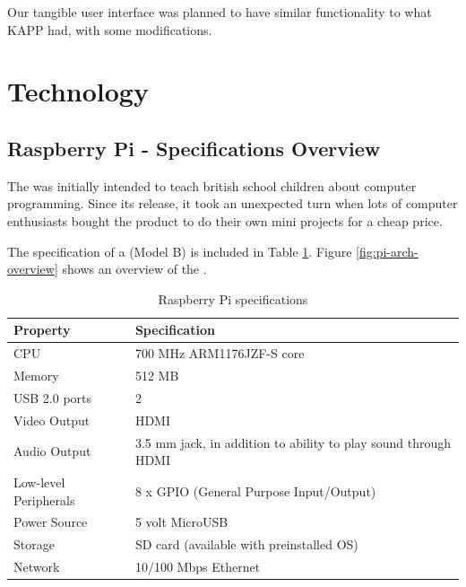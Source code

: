 Our tangible user interface was planned to have similar functionality to what KAPP had, with some modifications. 
 
\section{Technology}
\label{sec:technology}

\subsection{Raspberry Pi - Specifications Overview}
The \rpi{} was initially intended to teach british school children about computer programming\cite{rasperrypi-about}. Since its release, it took an unexpected turn when lots of computer enthusiasts bought the product to do their own mini projects for a cheap price. 

The specification of a \rpi{} (Model B) is included in Table \ref{tab:pi-specs}. Figure \ref{fig:pi-arch-overview} shows an overview of the \rpi{}.        

\begin{table}[H]
\centering
\begin{tabular}{|p{6.0cm} | p{6.0cm} |}
\hline 
\textbf{Property} & \textbf{Specification} \\
\hline
CPU & 700 MHz ARM1176JZF-S core \\
\hline
Memory & 512 MB \\
\hline
USB 2.0 ports & 2 \\
\hline
Video Output & HDMI \\
\hline
Audio Output & 3.5 mm jack, in addition to ability to play sound through HDMI \\
\hline
Low-level Peripherals & 8 x GPIO (General Purpose Input/Output) \\
\hline
Power Source & 5 volt MicroUSB \\
\hline
Storage & SD card (available with preinstalled OS) \\
\hline
Network & 10/100 Mbps Ethernet  \\
\hline
\end{tabular}
\caption{Raspberry Pi specifications}
\label{tab:pi-specs}
\end{table}

